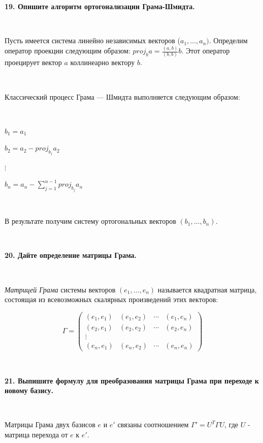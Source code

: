 \documentclass{article}
\begin{document}
	\textbf{19. Опишите алгоритм ортогонализации Грама-Шмидта.}
	
	$\;$
	{
		\setlength{\parindent}{0.4cm}
		\hangindent=0.4cm
		
		Пусть имеется система линейно независимых векторов ($a_1, \dots, a_n).$ Определим оператор проекции следующим образом: $proj_ba= \frac{(a, b)}{(b,b)}b.$ Этот оператор проецирует вектор $a$ коллинеарно вектору $b$. 
		
		$\;$
		
		Классический процесс Грама — Шмидта выполняется следующим образом:
		
		$\;$
		
		\setlength{\parindent}{0.8cm}
		\hangindent=0.8cm
		
		$b_1=a_1$
		
		$b_2=a_2 - proj_{b_1}a_2$
		
		$\vdots$
		
		$b_n = a_n - \sum_{j=1}^{n-1} proj_{b_j}a_n$
		
		\setlength{\parindent}{0.4cm}
		\hangindent=0.4cm
		
		$\;$
		
		В результате получим систему ортогональных векторов $(b_1, \dots, b_n).$
		
		$\;$
		\setlength{\parindent}{0cm}
		\hangindent=0cm
	}
	
	\textbf{20. Дайте определение матрицы Грама.}
	
	$\;$
	{
		\setlength{\parindent}{0.4cm}
		\hangindent=0.4cm
		
		\textit{Матрицей Грама} системы векторов $(e_1, \dots, e_n)$ называется квадратная матрица, состоящая из всевозможных скалярных произведений этих векторов:
		
		$$
		\Gamma = 
		\begin{pmatrix}
		(e_1, e_1) & (e_1, e_2) &\dotsb& (e_1, e_n) \\
		(e_2, e_1) & (e_2, e_2) & \dotsb & (e_2, e_n) \\
		\vdots &&& \\
		(e_n, e_1) & (e_n, e_2) & \dotsb & (e_n, e_n) 
		\end{pmatrix}
		$$	
		
		$\;$
		\setlength{\parindent}{0cm}
		\hangindent=0cm
	}
	
	\textbf{21. Выпишите формулу для преобразования матрицы Грама при переходе к новому базису.}
	
	$\;$
	{
		\setlength{\parindent}{0.4cm}
		\hangindent=0.4cm
		
		Матрицы Грама двух базисов $e$ и $e'$ связаны соотношением $\Gamma' = U^T \Gamma U $, где $U$ - матрица перехода от $e$ к $e'$.
		
		$\;$
		\setlength{\parindent}{0cm}
		\hangindent=0cm
	}
\end{document}
